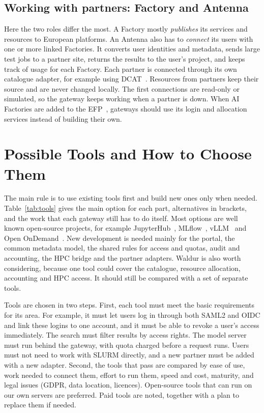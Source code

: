 \documentclass[conference,a4paper]{IEEEtran}
\begin{document}
\subsection{Working with partners: Factory and Antenna}
Here the two roles differ the most. A Factory mostly \emph{publishes} its services and resources to European platforms. An Antenna also has to \emph{connect} its users with one or more linked Factories. It converts user identities and metadata, sends large test jobs to a partner site, returns the results to the user's project, and keeps track of usage for each Factory. Each partner is connected through its own catalogue adapter, for example using DCAT~\cite{w3c_dcat3}. Resources from partners keep their source and are never changed locally. The first connections are read-only or simulated, so the gateway keeps working when a partner is down. When AI Factories are added to the EFP~\cite{eurohpc_efp}, gateways should use its login and allocation services instead of building their own.

\section{Possible Tools and How to Choose Them}

The main rule is to use existing tools first and build new ones only when needed. Table~\ref{tab:tools} gives the main option for each part, alternatives in brackets, and the work that each gateway still has to do itself. Most options are well known open-source projects, for example JupyterHub~\cite{kluyver2016jupyter}, MLflow~\cite{zaharia2018mlflow}, vLLM~\cite{kwon2023vllm} and Open OnDemand~\cite{hudak2018ood}. New development is needed mainly for the portal, the common metadata model, the shared rules for access and quotas, audit and accounting, the HPC bridge and the partner adapters. Waldur is also worth considering, because one tool could cover the catalogue, resource allocation, accounting and HPC access. It should still be compared with a set of separate tools.

Tools are chosen in two steps. First, each tool must meet the basic requirements for its area. For example, it must let users log in through both SAML2 and OIDC and link these logins to one account, and it must be able to revoke a user's access immediately. The search must filter results by access rights. The model server must run behind the gateway, with quota charged before a request runs. Users must not need to work with SLURM directly, and a new partner must be added with a new adapter. Second, the tools that pass are compared by ease of use, work needed to connect them, effort to run them, speed and cost, maturity, and legal issues (GDPR, data location, licences). Open-source tools that can run on our own servers are preferred. Paid tools are noted, together with a plan to replace them if needed.
\end{document}
